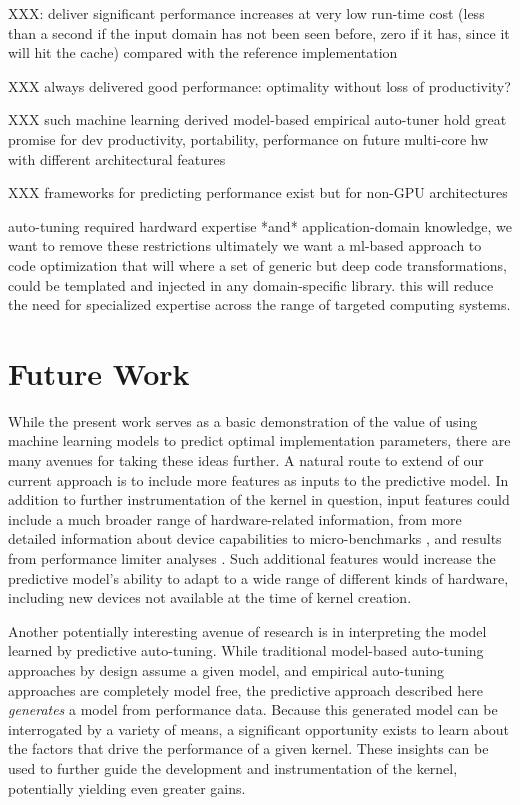 \documentclass{sig-alternate}
\begin{document}
XXX: deliver significant performance increases at very low run-time cost (less
than a second if the input domain has not been seen before, zero if it
has, since it will hit the cache) compared with the reference
implementation

XXX always delivered good performance: optimality without loss of productivity?

XXX such machine learning derived model-based empirical auto-tuner hold great
promise for dev productivity, portability, performance on future multi-core hw
with different architectural features

XXX frameworks for predicting performance exist \cite{XXX Hwu An Adaptive
Performance Modeling Tool for GPU Architectures}
but for non-GPU architectures

auto-tuning required hardward expertise *and* application-domain knowledge, we
want to remove these restrictions ultimately we want a ml-based approach to
code optimization that will where a set of generic but deep code
transformations, could be templated and injected in any domain-specific
library. this will reduce the need for specialized expertise across the range
of targeted computing systems.

\section{Future Work}

While the present work serves as a basic demonstration of the value of using machine learning models to predict optimal implementation parameters, there are many avenues for taking these ideas further. A natural route to extend of our current approach is to include more features as inputs to the predictive model.  In addition to further instrumentation of the kernel in question, input features could include a much broader range of hardware-related information, from more detailed information about device capabilities to micro-benchmarks  \citep{wong2010demystifying}, and results from performance limiter analyses \citep{micikevicius2010analysis}. Such additional features would increase the predictive model's ability to adapt to a wide range of different kinds of hardware, including new devices not available at the time of kernel creation.

Another potentially interesting avenue of research is in interpreting the model learned by predictive auto-tuning.  While traditional model-based auto-tuning approaches by design assume a given model, and empirical auto-tuning approaches are completely model free, the predictive approach described here \emph{generates} a model from performance data.  Because this generated model can be interrogated by a variety of means, a significant opportunity exists to learn about the factors that drive the performance of a given kernel.  These insights can be used to further guide the development and instrumentation of the kernel, potentially yielding even greater gains.
\end{document}
